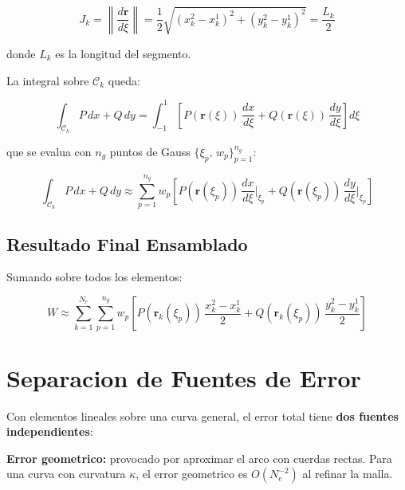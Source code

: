 \documentclass[12pt,a4paper]{article}
\begin{document}
\begin{equation}
    J_k = \left\|\frac{d\mathbf{r}}{d\xi}\right\|
        = \frac{1}{2}\sqrt{(x_k^2-x_k^1)^2 + (y_k^2-y_k^1)^2}
        = \frac{L_k}{2}
    \label{eq:jacobiano}
\end{equation}

donde $L_k$ es la longitud del segmento.

La integral sobre $\mathcal{C}_k$ queda:

\begin{equation}
    \int_{\mathcal{C}_k} P\,dx + Q\,dy
    = \int_{-1}^{1} \left[
        P(\mathbf{r}(\xi))\,\frac{dx}{d\xi}
      + Q(\mathbf{r}(\xi))\,\frac{dy}{d\xi}
      \right] d\xi
\end{equation}

que se evalua con $n_g$ puntos de Gauss $\{\xi_p,\, w_p\}_{p=1}^{n_g}$:

\begin{equation}
\boxed{
    \int_{\mathcal{C}_k} P\,dx + Q\,dy
    \approx \sum_{p=1}^{n_g} w_p \left[
        P(\mathbf{r}(\xi_p))\,\frac{dx}{d\xi}\bigg|_{\xi_p}
      + Q(\mathbf{r}(\xi_p))\,\frac{dy}{d\xi}\bigg|_{\xi_p}
    \right]
}
\label{eq:gauss_elem}
\end{equation}

\subsection{Resultado Final Ensamblado}

Sumando sobre todos los elementos:

\begin{equation}
\boxed{
    W \approx \sum_{k=1}^{N_e}\sum_{p=1}^{n_g} w_p \left[
        P(\mathbf{r}_k(\xi_p))\,\frac{x_k^2-x_k^1}{2}
      + Q(\mathbf{r}_k(\xi_p))\,\frac{y_k^2-y_k^1}{2}
    \right]
}
\label{eq:resultado_final}
\end{equation}

\section{Separacion de Fuentes de Error}

Con elementos lineales sobre una curva general, el error total tiene
\textbf{dos fuentes independientes}:

\textbf{Error geometrico:} provocado por aproximar el arco con cuerdas
rectas. Para una curva con curvatura $\kappa$, el error geometrico es
$O(N_e^{-2})$ al refinar la malla.
\end{document}
